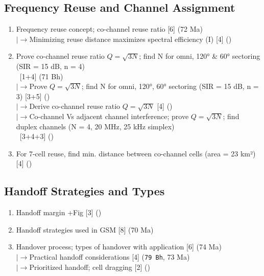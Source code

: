 \documentclass[12pt]{article}
\newcommand{\lb}{\\$\left|\rightarrow\right.$}
\newcommand{\enter}{\\\textcolor{white}{1}}
\begin{document}
  \subsection{Frequency Reuse and Channel Assignment}
    \begin{enumerate}[topsep=0pt, noitemsep]
      \item Frequency reuse concept; co-channel reuse ratio \hfill [6] (72 Ma)
        \lb Minimizing reuse distance maximizes spectral efficiency (I) \hfill [4] ()
      \item Prove co-channel reuse ratio $Q = \sqrt{3N}$; find N for
        omni, 120° \& 60° sectoring (SIR = 15 dB, n = 4)
        \enter\hfill [1+4] (71 Bh)
        \lb Prove $Q = \sqrt{3N}$; find N for omni, 120°, 60° sectoring
        (SIR = 15 dB, n = 3) \hfill [3+5] ()
        \lb Derive co-channel reuse ratio $Q = \sqrt{3N}$ \hfill [4] ()
        \lb Co-channel Vs adjacent channel interference; prove $Q = \sqrt{3N}$;
        find duplex channels (N = 4, 20 MHz, 25 kHz simplex)
        \enter\hfill [3+4+3] ()
      \item For 7-cell reuse, find min. distance between co-channel cells (area = 23 km²) \hfill [4] ()
    \end{enumerate}

  \subsection{Handoff Strategies and Types}
    \begin{enumerate}[topsep=0pt, noitemsep]
      \item Handoff margin +Fig \hfill [3] ()
      \item Handoff strategies used in GSM \hfill [8] (70 Ma)
      \item Handover process; types of handover with application \hfill [6] (74 Ma)
        \lb Practical handoff considerations \hfill [4] (\texttt{79 Bh}, 73 Ma)
        \lb Prioritized handoff; cell dragging \hfill [2] ()
    \end{enumerate}
\end{document}

